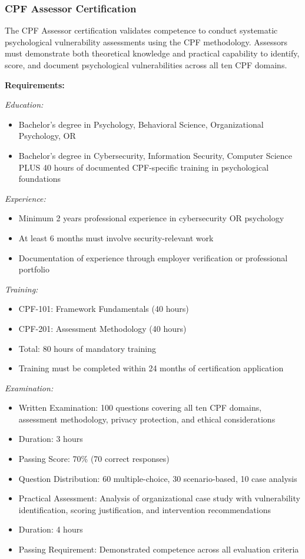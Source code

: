 \documentclass[11pt,a4paper]{article}
\begin{document}
\subsubsection{CPF Assessor Certification}

The CPF Assessor certification validates competence to conduct systematic psychological vulnerability assessments using the CPF methodology. Assessors must demonstrate both theoretical knowledge and practical capability to identify, score, and document psychological vulnerabilities across all ten CPF domains.

\textbf{Requirements:}

\textit{Education:}
\begin{itemize}
\item Bachelor's degree in Psychology, Behavioral Science, Organizational Psychology, OR
\item Bachelor's degree in Cybersecurity, Information Security, Computer Science PLUS 40 hours of documented CPF-specific training in psychological foundations
\end{itemize}

\textit{Experience:}
\begin{itemize}
\item Minimum 2 years professional experience in cybersecurity OR psychology
\item At least 6 months must involve security-relevant work
\item Documentation of experience through employer verification or professional portfolio
\end{itemize}

\textit{Training:}
\begin{itemize}
\item CPF-101: Framework Fundamentals (40 hours)
\item CPF-201: Assessment Methodology (40 hours)
\item Total: 80 hours of mandatory training
\item Training must be completed within 24 months of certification application
\end{itemize}

\textit{Examination:}
\begin{itemize}
\item Written Examination: 100 questions covering all ten CPF domains, assessment methodology, privacy protection, and ethical considerations
\item Duration: 3 hours
\item Passing Score: 70\% (70 correct responses)
\item Question Distribution: 60 multiple-choice, 30 scenario-based, 10 case analysis
\item Practical Assessment: Analysis of organizational case study with vulnerability identification, scoring justification, and intervention recommendations
\item Duration: 4 hours
\item Passing Requirement: Demonstrated competence across all evaluation criteria
\end{itemize}
\end{document}
